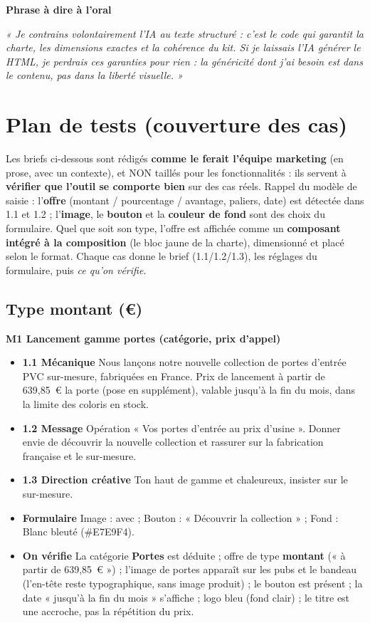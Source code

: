 \documentclass[11pt,a4paper]{article}
\newcommand{\phrasea}[1]{%
  \begin{phrasebox}
  {\bfseries\color{gefblue}\textsf{Phrase à dire à l'oral}}\par\smallskip
  \itshape #1
  \end{phrasebox}%
}
\begin{document}
\phrasea{« Je contrains volontairement l'IA au texte structuré : c'est le code qui
garantit la charte, les dimensions exactes et la cohérence du kit. Si je laissais
l'IA générer le HTML, je perdrais ces garanties pour rien : la généricité dont j'ai
besoin est dans le contenu, pas dans la liberté visuelle. »}

\section{Plan de tests (couverture des cas)}

Les briefs ci-dessous sont rédigés \textbf{comme le ferait l'équipe marketing} (en prose,
avec un contexte), et NON taillés pour les fonctionnalités : ils servent à \textbf{vérifier
que l'outil se comporte bien} sur des cas réels. Rappel du modèle de saisie : l'\textbf{offre}
(montant / pourcentage / avantage, paliers, date) est détectée dans 1.1 et 1.2 ; l'\textbf{image},
le \textbf{bouton} et la \textbf{couleur de fond} sont des choix du formulaire. Quel que soit son
type, l'offre est affichée comme un \textbf{composant intégré à la composition} (le bloc jaune de
la charte), dimensionné et placé selon le format.
Chaque cas donne le brief (1.1/1.2/1.3), les réglages du formulaire, puis \emph{ce qu'on vérifie}.

\subsection{Type montant (€)}

\textbf{M1 \textbullet{} Lancement gamme portes (catégorie, prix d'appel)}
\begin{itemize}[leftmargin=1.4em]
  \item \textbf{1.1 Mécanique} Nous lançons notre nouvelle collection de portes d'entrée
        PVC sur-mesure, fabriquées en France. Prix de lancement à partir de 639,85~€ la
        porte (pose en supplément), valable jusqu'à la fin du mois, dans la limite des
        coloris en stock.
  \item \textbf{1.2 Message} Opération « Vos portes d'entrée au prix d'usine ». Donner
        envie de découvrir la nouvelle collection et rassurer sur la fabrication française
        et le sur-mesure.
  \item \textbf{1.3 Direction créative} Ton haut de gamme et chaleureux, insister sur le
        sur-mesure.
  \item \textbf{Formulaire} Image : avec ; Bouton : « Découvrir la collection » ; Fond :
        Blanc bleuté (\#E7E9F4).
  \item \textbf{On vérifie} La catégorie \textbf{Portes} est déduite ; offre de type
        \textbf{montant} (« à partir de 639,85~€ ») ; l'image de portes apparaît sur les pubs
        et le bandeau (l'en-tête reste typographique, sans image produit) ; le bouton est
        présent ; la date « jusqu'à la fin du mois »
        s'affiche ; logo bleu (fond clair) ; le titre est une accroche, pas la répétition
        du prix.
\end{itemize}
\end{document}
